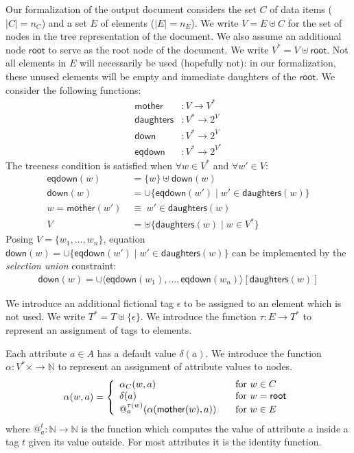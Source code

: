 \documentclass{article}
\makeatletter
\newcommand{\NAT}{{\mathbb N}}
\newcommand{\SET}[1]{{\{{#1}\}}}
\newcommand{\TO}{\rightarrow}
\newcommand{\ROOT}{{\textsf{root}}}
\newcommand{\MOTHER}{{\textsf{mother}}}
\newcommand{\DAUGHTERS}{{\textsf{daughters}}}
\newcommand{\DOWN}{{\textsf{down}}}
\newcommand{\EQDOWN}{{\textsf{eqdown}}}
\newcommand{\UNION}{\cup}
\newcommand{\TUP}[1]{{\langle{#1}\rangle}}
\newcommand{\EPS}{\epsilon}
\newcommand{\AT}[2]{@^{#1}_{#2}}
\makeatother
\begin{document}
Our formalization of the output document considers the set $C$ of data
items ($|C|=n_C$) and a set $E$ of elements ($|E|=n_E$).  We write
$V=E\uplus C$ for the set of nodes in the tree representation of the
document.  We also assume an additional node $\ROOT$ to serve as the
root node of the document.  We write $V^*=V\uplus\ROOT$.  Not all
elements in $E$ will necessarily be used (hopefully not): in our
formalization, these unused elements will be empty and immediate
daughters of the $\ROOT$.  We consider the following functions:
\begin{align*}
\MOTHER &: V\TO V^*\\
\DAUGHTERS &: V^*\TO 2^V\\
\DOWN &: V^*\TO 2^V\\
\EQDOWN &: V^*\TO 2^{V^*}
\end{align*}
The treeness condition is satisfied when $\forall w\in V^*$ and
$\forall w'\in V$:
\begin{align*}
\EQDOWN(w)&=\SET{w}\uplus\DOWN(w)\\
\DOWN(w)&={\UNION}\SET{\EQDOWN(w')\mid w'\in\DAUGHTERS(w)}\\
w=\MOTHER(w')\ &\equiv\ w'\in\DAUGHTERS(w)\\
V&={\uplus}\SET{\DAUGHTERS(w)\mid w\in V^*}
\end{align*}
Posing $V=\SET{w_1,\ldots,w_n}$,
equation $\DOWN(w)={\UNION}\SET{\EQDOWN(w')\mid w'\in\DAUGHTERS(w)}$
can be implemented by the \emph{selection union} constraint:
\begin{gather*}
\DOWN(w)={\UNION}\TUP{\EQDOWN(w_1),\ldots,\EQDOWN(w_n)}[\DAUGHTERS(w)]
\end{gather*}

We introduce an additional fictional tag $\EPS$ to be assigned to an
element which is not used.  We write $T^*=T\uplus\SET{\EPS}$.  We
introduce the function $\tau:E\TO T^*$ to represent an assignment of
tags to elements.

Each attribute $a\in A$ has a default value $\delta(a)$.  We introduce
the function $\alpha:V^*\times\TO\NAT$ to represent an assignment of
attribute values to nodes.
\begin{gather*}
\alpha(w,a) = \left\{
\begin{array}{l@{\qquad}l}
\alpha_C(w,a) & \text{for } w\in C\\
\delta(a) & \text{for } w=\ROOT\\
\AT{\tau(w)}{a}(\alpha(\MOTHER(w),a)) & \text{for } w\in E
\end{array}
\right.
\end{gather*}
where $\AT{t}{a}:\NAT\TO\NAT$ is the function which computes the value
of attribute $a$ inside a tag $t$ given its value outside.  For most
attributes it is the identity function.
\end{document}
